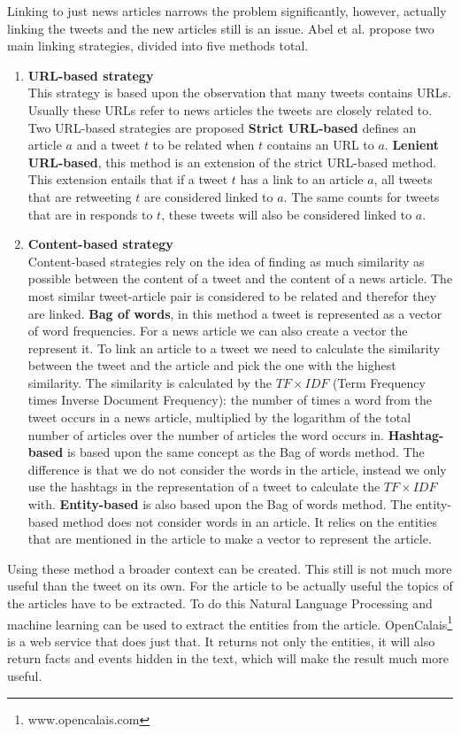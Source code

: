 \documentclass{article}
\begin{document}
Linking to just news articles narrows the problem significantly, however, actually linking the tweets and the new articles still is an issue. Abel et al. propose two main linking strategies, divided into five methods total.
\begin{enumerate}
\item \textbf{URL-based strategy}\\
This strategy is based upon the observation that many tweets contains URLs. Usually these URLs refer to news articles the tweets are closely related to. Two URL-based strategies are proposed
	\subitem \textbf{Strict URL-based} defines an article $a$ and a tweet $t$ to be related when $t$ contains an URL to $a$.
	\subitem \textbf{Lenient URL-based}, this method is an extension of the strict URL-based method. This extension entails that if a tweet $t$ has a link to an article $a$, all tweets that are retweeting $t$ are considered linked to $a$. The same counts for tweets that are in responds to $t$, these tweets will also be considered linked to $a$.
\item \textbf{Content-based strategy}\\
Content-based strategies rely on the idea of finding as much similarity as possible between the content of a tweet and the content of a news article. The most similar tweet-article pair is considered to be related and therefor they are linked.
	\subitem \textbf{Bag of words}, in this method a tweet is represented as a vector of word frequencies. For a news article we can also create a vector the represent it. To link an article to a tweet we need to calculate the similarity between the tweet and the article and pick the one with the highest similarity. The similarity is calculated by the $TF \times IDF$ (Term Frequency times Inverse Document Frequency): the number of times a word from the tweet occurs in a news article, multiplied by the logarithm of the total number of articles over the number of articles the word occurs in. \cite{tfidf}
	\subitem \textbf{Hashtag-based} is based upon the same concept as the Bag of words method. The difference is that we do not consider the words in the article, instead we only use the hashtags in the representation of a tweet to calculate the $TF \times IDF$ with.
	\subitem \textbf{Entity-based} is also based upon the Bag of words method. The entity-based method does not consider words in an article. It relies on the entities that are mentioned in the article to make a vector to represent the article. 
\end{enumerate}
Using these method a broader context can be created. This still is not much more useful than the tweet on its own. For the article to be actually useful the topics of the articles have to be extracted. To do this Natural Language Processing and machine learning can be used to extract the entities from the article. OpenCalais\footnote{www.opencalais.com} is a web service that does just that. It returns not only the entities, it will also return facts and events hidden in the text, which will make the result much more useful.
\end{document}
